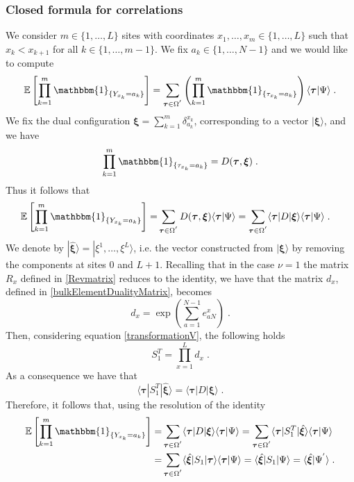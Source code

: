 \documentclass[10pt]{article}
\numberwithin{equation}{section}
\numberwithin{equation}{subsection}
\newcommand{\dt}{\;.}
\begin{document}
\subsubsection{Closed formula for correlations}\label{correlation-section}
We consider $m\in \{1,\ldots,L\}$ sites with coordinates $x_{1},\ldots,x_{m}\in \{1,\ldots,L\}$ such that $x_{k}<x_{k+1}$ for all $k\in \{1,\ldots,m-1\}$. We fix $a_{k}\in\{1,\ldots,N-1\}$ and we would like to compute
\begin{equation}
	\mathbb{E}\left[\prod_{k=1}^{m}\mathbbm{1}_{\{Y_{x_{k}}=a_{k}\}}\right]=\sum_{\bm{\tau}\in \Omega^{'}}\left(\prod_{k=1}^{m}\mathbbm{1}_{\{\tau_{x_{k}}=a_{k}\}}\right)\langle\bm{\tau}|\Psi\rangle\dt%
\end{equation}
We fix the dual configuration $\bm{\xi}=\sum_{k=1}^{m}\delta_{a_{k}}^{x_{k}}$, corresponding to a vector $|\bm{\xi}\rangle$, and we have 
\begin{equation}
	\prod_{k=1}^{m}\mathbbm{1}_{\{\tau_{x_{k}}=a_{k}\}}=D(\bm{\tau},\bm{\xi})\dt
\end{equation}
Thus it follows that 
\begin{align}
	\mathbb{E}\left[\prod_{k=1}^{m}\mathbbm{1}_{\{Y_{x_{k}}=a_{k}\}}\right]=&\sum_{\bm{\tau}\in \Omega^{'}}D(\bm{\tau},\bm{\xi})\langle\bm{\tau}|\Psi\rangle
	=\sum_{\bm{\tau}\in \Omega^{'}}\langle \bm{\tau}|D|\bm{\xi}\rangle\langle\bm{\tau}|\Psi\rangle\dt
\end{align}
We denote by $|\hat{\bm{\xi}}\rangle=|\xi^{1},\ldots,\xi^{L}\rangle$, i.e. the vector constructed from $|\bm{\xi}\rangle$ by removing the components at sites $0$ and $L+1$. Recalling that {in the case $\nu=1$ the matrix $R_{x}$ defined in \eqref{Revmatrix} reduces to the identity, we have that the matrix $d_{x}$, defined in \eqref{bulkElementDualityMatrix}, becomes
\begin{equation}
	d_{x}=\exp{(\sum_{a=1}^{N-1}e_{aN}^{x})}\dt
	\end{equation} Then, considering equation \eqref{transformationV}, the following holds}
\begin{equation}
	S_{1}^{T}=\prod_{x=1}^{L}d_{x}\dt
\end{equation}  
{As a consequence we have that }
\begin{equation}
	\langle \bm{\tau}|S_{1}^{T}|\hat{\bm{\xi}}\rangle=\langle \bm{\tau}|D|\bm{\xi}\rangle \dt
\end{equation}
Therefore, it follows that, using the resolution of the identity
\begin{align}
\label{corr-psi1}
	\mathbb{E}\left[\prod_{k=1}^{m}\mathbbm{1}_{\{Y_{x_{k}}=a_{k}\}}\right]=& \sum_{\bm{\tau}\in \Omega^{'}}\langle \bm{\tau}|D|\bm{\xi}\rangle\langle\bm{\tau}|\Psi\rangle
	=\sum_{\bm{\tau}\in \Omega^{'}}\langle \bm{\tau}|S_{1}^{T}|\hat{\bm{\xi}}\rangle\langle\bm{\tau}|\Psi\rangle\nonumber\\
	=&\sum_{\bm{\tau}\in \Omega^{'}}\langle \hat{\bm{\xi}}|S_{1}|\bm{\tau}\rangle\langle\bm{\tau}|\Psi\rangle
	=\langle \hat{\bm{\xi}}|S_{1}|\Psi\rangle
	=\langle \hat{\bm{\xi}}|\Psi^{'}\rangle\dt
\end{align}
\end{document}
